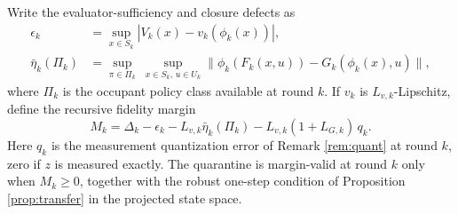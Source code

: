 \documentclass[11pt]{article}
\theoremstyle{definition}
\theoremstyle{remark}
\newcommand{\etabar}{\bar{\eta}}
\begin{document}
Write the evaluator-sufficiency and closure defects as
\begin{align}
\epsilon_k&=\sup_{x\in S_k}|V_k(x)-v_k(\phi_k(x))|, \\
\etabar_k(\Pi_k)&=\sup_{\pi\in\Pi_k}\ \sup_{x\in S_k,\,u\in U_k}\|\phi_k(F_k(x,u))-G_k(\phi_k(x),u)\|,
\end{align}
where $\Pi_k$ is the occupant policy class available at round $k$. If $v_k$ is $L_{v,k}$-Lipschitz, define the recursive fidelity margin
\begin{equation}
M_k=\Delta_k-\epsilon_k-L_{v,k}\etabar_k(\Pi_k)-L_{v,k}(1+L_{G,k})\,q_k. \label{eq:margin}
\end{equation}
Here $q_k$ is the measurement quantization error of Remark \ref{rem:quant} at round $k$, zero if $z$ is measured exactly. The quarantine is margin-valid at round $k$ only when $M_k\ge0$, together with the robust one-step condition of Proposition \ref{prop:transfer} in the projected state space.
\end{document}
